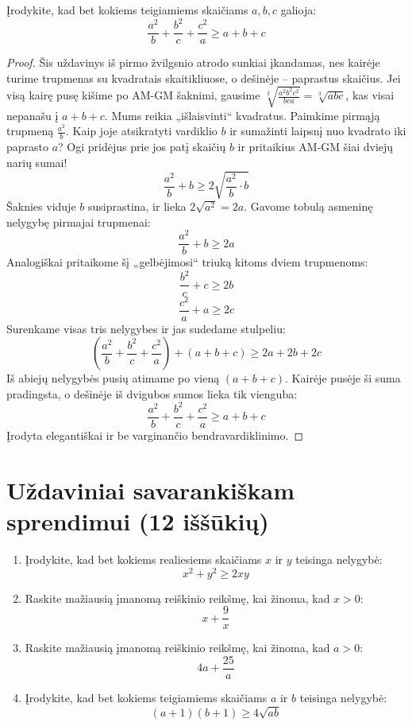 \documentclass[11pt,a4paper]{scrartcl}
\begin{document}
\begin{example}
Įrodykite, kad bet kokiems teigiamiems skaičiams $a, b, c$ galioja:
$$ \frac{a^2}{b} + \frac{b^2}{c} + \frac{c^2}{a} \ge a + b + c $$
\end{example}
\begin{proof}
Šis uždavinys iš pirmo žvilgsnio atrodo sunkiai įkandamas, nes kairėje turime trupmenas su kvadratais skaitikliuose, o dešinėje – paprastus skaičius. Jei visą kairę pusę kišime po AM-GM šaknimi, gausime $\sqrt[3]{\frac{a^2b^2c^2}{bca}} = \sqrt[3]{abc}$, kas visai nepanašu į $a+b+c$. Mums reikia „išlaisvinti“ kvadratus.
Paimkime pirmąją trupmeną $\frac{a^2}{b}$. Kaip joje atsikratyti vardiklio $b$ ir sumažinti laipsnį nuo kvadrato iki paprasto $a$? Ogi pridėjus prie jos patį skaičių $b$ ir pritaikius AM-GM šiai dviejų narių sumai!
$$ \frac{a^2}{b} + b \ge 2\sqrt{\frac{a^2}{b} \cdot b} $$
Šaknies viduje $b$ susiprastina, ir lieka $2\sqrt{a^2} = 2a$.
Gavome tobulą asmeninę nelygybę pirmajai trupmenai:
$$ \frac{a^2}{b} + b \ge 2a $$
Analogiškai pritaikome šį „gelbėjimosi“ triuką kitoms dviem trupmenoms:
$$ \frac{b^2}{c} + c \ge 2b $$
$$ \frac{c^2}{a} + a \ge 2c $$
Surenkame visas tris nelygybes ir jas sudedame stulpeliu:
$$ \left(\frac{a^2}{b} + \frac{b^2}{c} + \frac{c^2}{a}\right) + (a + b + c) \ge 2a + 2b + 2c $$
Iš abiejų nelygybės pusių atimame po vieną $(a+b+c)$. Kairėje pusėje ši suma pradingsta, o dešinėje iš dvigubos sumos lieka tik vienguba:
$$ \frac{a^2}{b} + \frac{b^2}{c} + \frac{c^2}{a} \ge a + b + c $$
Įrodyta elegantiškai ir be varginančio bendravardiklinimo.
\end{proof}

\vspace{0.5cm}

\newpage
\section{Uždaviniai savarankiškam sprendimui (12 iššūkių)}

\begin{enumerate}
    \renewcommand{\labelenumi}{\textbf{\theenumi.}}

    \item Įrodykite, kad bet kokiems realiesiems skaičiams $x$ ir $y$ teisinga nelygybė:
    $$ x^2 + y^2 \ge 2xy $$

    \item Raskite mažiausią įmanomą reiškinio reikšmę, kai žinoma, kad $x > 0$:
    $$ x + \frac{9}{x} $$

    \item Raskite mažiausią įmanomą reiškinio reikšmę, kai žinoma, kad $a > 0$:
    $$ 4a + \frac{25}{a} $$

    \item Įrodykite, kad bet kokiems teigiamiems skaičiams $a$ ir $b$ teisinga nelygybė:
    $$ (a+1)(b+1) \ge 4\sqrt{ab} $$
\end{enumerate}
\end{document}
